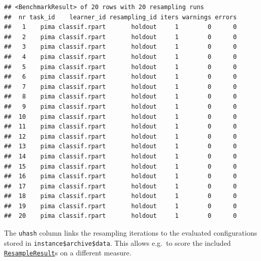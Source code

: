 \documentclass[
]{scrbook}
\newenvironment{Shaded}{\begin{snugshade}}{\end{snugshade}}
\newcommand{\FunctionTok}[1]{\textcolor[rgb]{0.00,0.00,0.00}{#1}}
\newcommand{\NormalTok}[1]{#1}
\newcommand{\SpecialCharTok}[1]{\textcolor[rgb]{0.00,0.00,0.00}{#1}}
\newcommand{\StringTok}[1]{\textcolor[rgb]{0.31,0.60,0.02}{#1}}
\renewenvironment{Shaded} {\begin{snugshade}\small} {\end{snugshade}}
\begin{document}
\begin{verbatim}
## <BenchmarkResult> of 20 rows with 20 resampling runs
##  nr task_id    learner_id resampling_id iters warnings errors
##   1    pima classif.rpart       holdout     1        0      0
##   2    pima classif.rpart       holdout     1        0      0
##   3    pima classif.rpart       holdout     1        0      0
##   4    pima classif.rpart       holdout     1        0      0
##   5    pima classif.rpart       holdout     1        0      0
##   6    pima classif.rpart       holdout     1        0      0
##   7    pima classif.rpart       holdout     1        0      0
##   8    pima classif.rpart       holdout     1        0      0
##   9    pima classif.rpart       holdout     1        0      0
##  10    pima classif.rpart       holdout     1        0      0
##  11    pima classif.rpart       holdout     1        0      0
##  12    pima classif.rpart       holdout     1        0      0
##  13    pima classif.rpart       holdout     1        0      0
##  14    pima classif.rpart       holdout     1        0      0
##  15    pima classif.rpart       holdout     1        0      0
##  16    pima classif.rpart       holdout     1        0      0
##  17    pima classif.rpart       holdout     1        0      0
##  18    pima classif.rpart       holdout     1        0      0
##  19    pima classif.rpart       holdout     1        0      0
##  20    pima classif.rpart       holdout     1        0      0
\end{verbatim}

The \texttt{uhash} column links the resampling iterations to the evaluated configurations stored in \texttt{instance\$archive\$data}. This allows e.g.~to score the included \href{https://mlr3.mlr-org.com/reference/ResampleResult.html}{\texttt{ResampleResult}}s on a different measure.

\begin{Shaded}
\end{Shaded}
\end{document}
